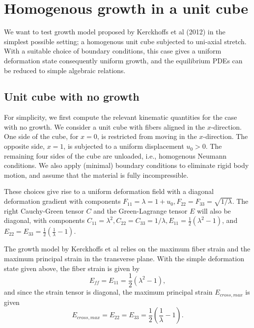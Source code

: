 \documentclass[a4paper,10pt]{article}
\begin{document}
\section{Homogenous growth in a unit cube}
We want to test growth model proposed by Kerckhoffs et al (2012) in the simplest possible setting; a 
homogenous unit cube subjected to uni-axial stretch. With a suitable choice of boundary conditions, this case gives a 
uniform deformation state consequently uniform growth, and the equilibrium PDEs can be reduced to simple
algebraic relations. 

\subsection{Unit cube with no growth}
For simplicity, we first compute the relevant kinematic quantities for the case with no growth. 
We consider a unit cube with fibers aligned in the $x$-direction. One side of the cube, for $x=0$, is 
restricted from moving in the $x$-direction. The opposite side, $x=1$, is subjected to a uniform
displacement $u_0 > 0$. The remaining four sides of the cube are unloaded, i.e., homogenous 
Neumann conditions. We also apply (minimal) boundary conditions to eliminate rigid body motion, and assume
that the material is fully incompressible. 

These choices give rise to a uniform
deformation field with a diagonal deformation gradient with components
$F_{11} = \lambda = 1+u_0, F_{22}=F_{33} = \sqrt{1/\lambda}$.
The right Cauchy-Green tensor $C$ and the Green-Lagrange tensor
$E$ will also be diagonal, with components $C_{11} = \lambda^2 , 
C_{22} =C_{33} = 1/\lambda,  
E_{11} = \frac{1}{2}(\lambda^2 - 1)$, and 
$E_{22} = E_{33} = \frac{1}{2}(\frac{1}{\lambda}-1).$

The growth model by Kerckhoffs et al relies on the maximum fiber strain and the maximum principal strain 
in the transverse plane. With the simple deformation state given above, the fiber strain is given by
\[
  E_{ff} = E_{11} = \frac{1}{2}(\lambda^2 - 1),
\]
and since the strain tensor is diagonal, the maximum principal strain $E_{cross,max}$ is given 
\[
  E_{cross,max} = E_{22} = E_{33} =  \frac{1}{2}(\frac{1}{\lambda}-1).
\]
\end{document}
